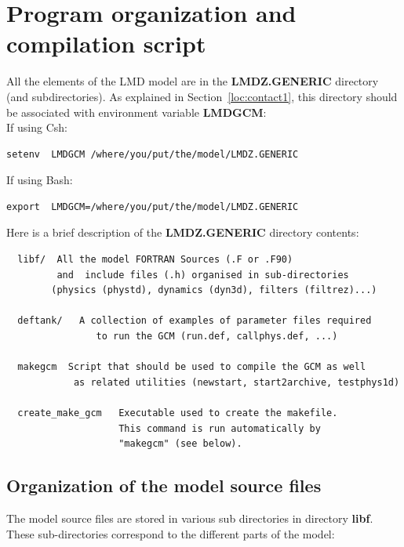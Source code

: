 \chapter{Program organization and compilation script}
\label{sc:info}

\label{loc:contenu}

All the elements of the LMD model are in the {\bf LMDZ.GENERIC} directory
(and subdirectories).
As explained in Section~\ref{loc:contact1}, this directory
should be associated with
 environment variable {\bf LMDGCM}:\\
If using Csh:
\begin{verbatim}
setenv  LMDGCM /where/you/put/the/model/LMDZ.GENERIC
\end{verbatim}
If using Bash:
\begin{verbatim}
export  LMDGCM=/where/you/put/the/model/LMDZ.GENERIC
\end{verbatim}

\noindent Here is a brief description of the
{\bf LMDZ.GENERIC} directory contents:
\begin{verbatim}
  libf/  All the model FORTRAN Sources (.F or .F90)
         and  include files (.h) organised in sub-directories
        (physics (phystd), dynamics (dyn3d), filters (filtrez)...)

  deftank/   A collection of examples of parameter files required
                to run the GCM (run.def, callphys.def, ...)

  makegcm  Script that should be used to compile the GCM as well
            as related utilities (newstart, start2archive, testphys1d)

  create_make_gcm   Executable used to create the makefile.
                    This command is run automatically by
                    "makegcm" (see below).

\end{verbatim}


\section{Organization of the model source files}

The model source files are stored in various sub directories
in directory {\bf libf}.
These sub-directories correspond to the different parts of the model:

